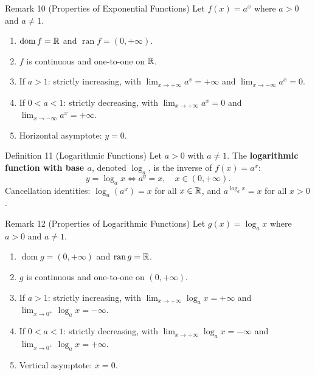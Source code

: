 \begin{remarkbox}{Remark 10 (Properties of Exponential Functions)}
Let \(f(x) = a^{x}\) where \(a > 0\) and \(a \neq 1\).
\begin{enumerate}
    \item \(\operatorname{dom} f = \mathbb{R}\) and \(\operatorname{ran} f = (0, +\infty)\).
    \item \(f\) is continuous and one-to-one on \(\mathbb{R}\).
    \item If \(a > 1\): strictly increasing, with \(\displaystyle\lim_{x \to +\infty} a^{x} = +\infty\) and \(\displaystyle\lim_{x \to -\infty} a^{x} = 0\).
    \item If \(0 < a < 1\): strictly decreasing, with \(\displaystyle\lim_{x \to +\infty} a^{x} = 0\) and \(\displaystyle\lim_{x \to -\infty} a^{x} = +\infty\).
    \item Horizontal asymptote: \(y = 0\).
\end{enumerate}
\end{remarkbox}

\begin{definitionbox}{Definition 11 (Logarithmic Functions)}
Let \(a > 0\) with \(a \neq 1\). The \textbf{logarithmic function with base \(a\)}, denoted \(\log_{a}\), is the inverse of \(f(x) = a^{x}\):
\[
y = \log_{a} x \iff a^{y} = x, \quad x \in (0, +\infty).
\]
Cancellation identities: \(\log_{a}(a^{x}) = x\) for all \(x \in \mathbb{R}\), and \(a^{\log_{a} x} = x\) for all \(x > 0\).
\end{definitionbox}

\begin{remarkbox}{Remark 12 (Properties of Logarithmic Functions)}
Let \(g(x) = \log_{a} x\) where \(a > 0\) and \(a \neq 1\).
\begin{enumerate}
    \item \(\operatorname{dom} g = (0, +\infty)\) and \(\operatorname{ran} g = \mathbb{R}\).
    \item \(g\) is continuous and one-to-one on \((0, +\infty)\).
    \item If \(a > 1\): strictly increasing, with \(\displaystyle\lim_{x \to +\infty} \log_{a} x = +\infty\) and \(\displaystyle\lim_{x \to 0^{+}} \log_{a} x = -\infty\).
    \item If \(0 < a < 1\): strictly decreasing, with \(\displaystyle\lim_{x \to +\infty} \log_{a} x = -\infty\) and \(\displaystyle\lim_{x \to 0^{+}} \log_{a} x = +\infty\).
    \item Vertical asymptote: \(x = 0\).
\end{enumerate}
\end{remarkbox}

